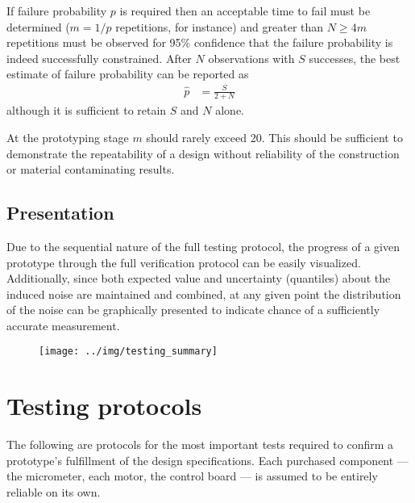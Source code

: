 \documentclass{article}
\begin{document}
If failure probability $p$ is required then an acceptable time to fail must be determined ($m = 1/p$ repetitions, for instance) and greater than $N \ge 4m$ repetitions must be observed for 95\% confidence that the failure probability is indeed successfully constrained. After $N$ observations with $S$ successes, the best estimate of failure probability can be reported as
\begin{align}
  \hat{p} &= \frac{S}{2 + N}
\end{align}
although it is sufficient to retain $S$ and $N$ alone.

At the prototyping stage $m$ should rarely exceed 20. This should be sufficient to demonstrate the repeatability of a design without reliability of the construction or material contaminating results.

\subsection{Presentation}
\label{sec:presentation}

Due to the sequential nature of the full testing protocol, the progress of a given prototype through the full verification protocol can be easily visualized. Additionally, since both expected value and uncertainty (quantiles) about the induced noise are maintained and combined, at any given point the distribution of the noise can be graphically presented to indicate chance of a sufficiently accurate measurement.

\begin{figure}[H]
  \centering
  \texttt{[image: ../img/testing\_summary]}
  \label{fig:summary}
\end{figure}

\section{Testing protocols}
\label{sec:protocols}

The following are protocols for the most important tests required to confirm a prototype's fulfillment of the design specifications. Each purchased component --- the micrometer, each motor, the control board --- is assumed to be entirely reliable on its own. 
\end{document}
